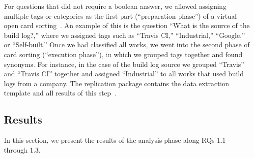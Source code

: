 For questions that did not require a boolean answer, we allowed assigning
multiple tags or categories as the first part (``preparation phase'')
of a virtual open card sorting~\citep{zimmermann2016card}.
An example of this is the question ``What is the source of the build
log?,''
where we assigned tags such as ``Travis CI,''
``Industrial,'' ``Google,'' or
``Self-built.''
Once we had classified all works, we went into the second phase of
card sorting
(``execution phase''), in which we grouped tags
together and found synonyms.
For instance, in the case of the build log source we grouped
``Travis'' and ``Travis CI'' together and assigned ``Industrial'' to
all works that used build logs from a company.
The replication package contains the data extraction template and all
results of this step~\citep{brandt2020chunk-replication}.


\subsection{Results}

\label{sec:litsurresults}

In this section, we present the results of the analysis phase along RQs 1.1 through
1.3.

